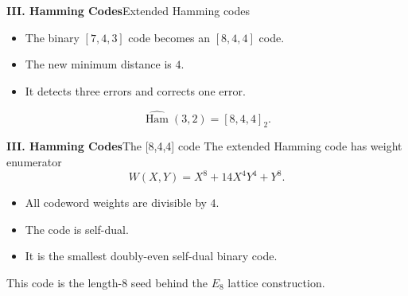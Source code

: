 %
%

\begin{frame}{\textbf{III. Hamming Codes}}{Extended Hamming codes}
\small
{}
\begin{itemize}
  \item The binary $[7,4,3]$ code becomes an $[8,4,4]$ code.
  \item The new minimum distance is $4$.
  \item It detects three errors and corrects one error.
\end{itemize}
\[
  \widehat{\operatorname{Ham}}(3,2)=[8,4,4]_2.
\]
\end{frame}

\begin{frame}{\textbf{III. Hamming Codes}}{The [8,4,4] code}
\small
The extended Hamming code has weight enumerator
\[
  W(X,Y)=X^8+14X^4Y^4+Y^8.
\]
\begin{itemize}
  \item All codeword weights are divisible by $4$.
  \item The code is self-dual.
  \item It is the smallest doubly-even self-dual binary code.
\end{itemize}
This code is the length-$8$ seed behind the $E_8$ lattice construction.
\end{frame}

